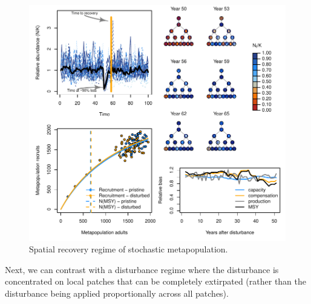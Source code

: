 \documentclass[]{article}
\begin{document}
\begin{figure}[H]

{\centering \includegraphics{Managing_for_ecological_surprises_in_metapopulations_makeHTML_files/figure-latex/example results3-1} 

}

\caption{Spatial recovery regime of stochastic metapopulation.}\label{fig:example results3}
\end{figure}

Next, we can contrast with a disturbance regime where the disturbance is
concentrated on local patches that can be completely extirpated (rather
than the disturbance being applied proportionally across all patches).
\end{document}
